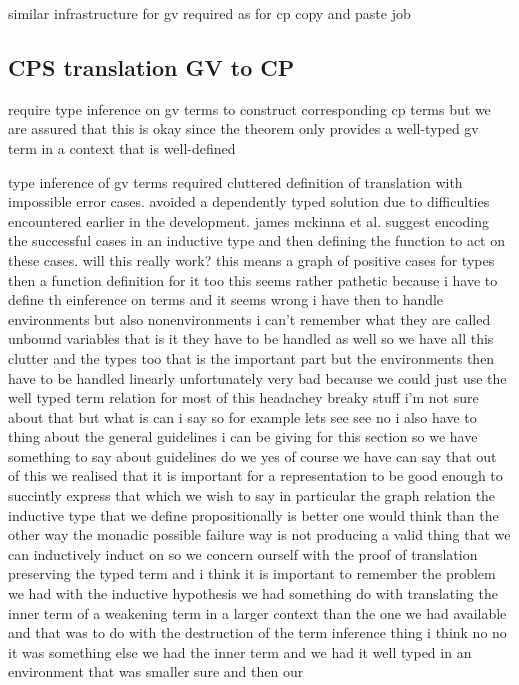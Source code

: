 similar infrastructure for gv required as for cp copy and paste job

\subsection{CPS translation GV to CP}

require type inference on gv terms to construct corresponding cp terms but we
are assured that this is okay since the theorem only provides a well-typed gv
term in a context that is well-defined

type inference of gv terms required cluttered definition of translation with
impossible error cases. avoided a dependently typed solution due to
difficulties encountered earlier in the development. james mckinna et
al. suggest encoding the successful cases in an inductive type and then
defining the function to act on these cases. will this really work? this means
a graph of positive cases for types then a function definition for it too this
seems rather pathetic because i have to define th einference on terms and it
seems wrong i have then to handle environments but also nonenvironments i
can't remember what they are called unbound variables that is it they have to
be handled as well so we have all this clutter and the types too that is the
important part but the environments then have to be handled linearly
unfortunately very bad because we could just use the well typed term relation
for most of this headachey breaky stuff i'm not sure about that but what is
can i say so for example lets see see no i also have to thing about the
general guidelines i can be giving for this section so we have something to
say about guidelines do we yes of course we have can say that out of this we
realised that it is important for a representation to be good enough to
succintly express that which we wish to say in particular the graph relation
the inductive type that we define propositionally is better one would think
than the other way the monadic possible failure way is not producing a valid
thing that we can inductively induct on so we concern ourself with the proof
of translation preserving the typed term and i think it is important to
remember the problem we had with the inductive hypothesis we had something do
with translating the inner term of a weakening term in a larger context than
the one we had available and that was to do with the destruction of the term
inference thing i think no no it was something else we had the inner term and
we had it well typed in an environment that was smaller sure and then our
